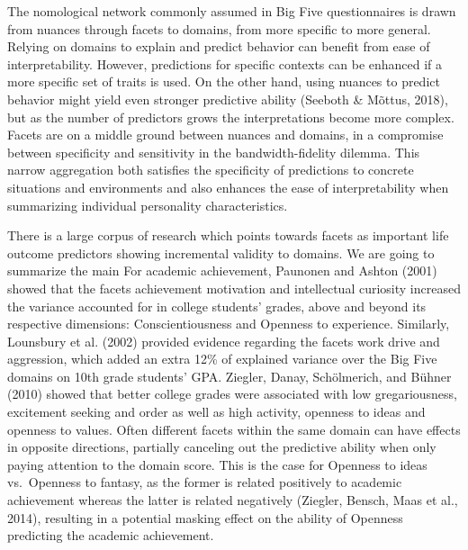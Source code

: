 \documentclass[,man,floatsintext]{apa6}
\theoremstyle{definition}
\theoremstyle{definition}
\theoremstyle{definition}
\theoremstyle{remark}
\begin{document}
The nomological network commonly assumed in Big Five questionnaires is
drawn from nuances through facets to domains, from more specific to more
general. Relying on domains to explain and predict behavior can benefit
from ease of interpretability. However, predictions for specific
contexts can be enhanced if a more specific set of traits is used. On
the other hand, using nuances to predict behavior might yield even
stronger predictive ability (Seeboth \& Mõttus, 2018), but as the number
of predictors grows the interpretations become more complex. Facets are
on a middle ground between nuances and domains, in a compromise between
specificity and sensitivity in the bandwidth-fidelity dilemma. This
narrow aggregation both satisfies the specificity of predictions to
concrete situations and environments and also enhances the ease of
interpretability when summarizing individual personality
characteristics.

There is a large corpus of research which points towards facets as
important life outcome predictors showing incremental validity to
domains. We are going to summarize the main For academic achievement,
Paunonen and Ashton (2001) showed that the facets achievement motivation
and intellectual curiosity increased the variance accounted for in
college students' grades, above and beyond its respective dimensions:
Conscientiousness and Openness to experience. Similarly, Lounsbury et
al. (2002) provided evidence regarding the facets work drive and
aggression, which added an extra 12\% of explained variance over the Big
Five domains on 10th grade students' GPA. Ziegler, Danay, Schölmerich,
and Bühner (2010) showed that better college grades were associated with
low gregariousness, excitement seeking and order as well as high
activity, openness to ideas and openness to values. Often different
facets within the same domain can have effects in opposite directions,
partially canceling out the predictive ability when only paying
attention to the domain score. This is the case for Openness to ideas
vs.~Openness to fantasy, as the former is related positively to academic
achievement whereas the latter is related negatively (Ziegler, Bensch,
Maas et al., 2014), resulting in a potential masking effect on the
ability of Openness predicting the academic achievement.
\end{document}
